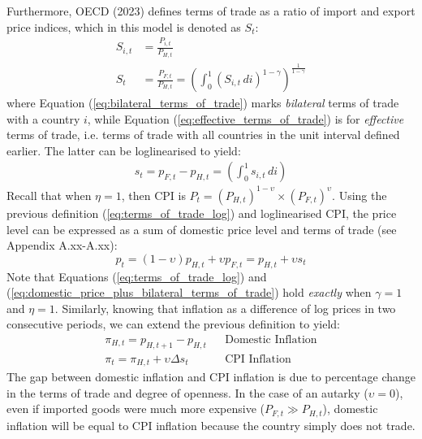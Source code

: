 Furthermore, OECD (2023) defines terms of trade as a ratio of import and export price indices, which in this model is denoted as $S_t$:
\begin{align}
    S_{i,t} &= \frac{P_{i,t}}{P_{H,t}}                       \label{eq:bilateral_terms_of_trade}                                                                                    \\
    S_{t} &=  \frac{P_{F,t}}{P_{H,t}} = \left(\int_{0}^{1} (S_{i,t} \, di)^{1-\gamma}\right)^{\frac{1}{1-\gamma}}            \label{eq:effective_terms_of_trade}              
\end{align}
where Equation (\ref{eq:bilateral_terms_of_trade}) marks \textit{bilateral} terms of trade with a country $i$, while Equation (\ref{eq:effective_terms_of_trade}) is for \textit{effective} terms of trade, i.e. terms of trade with all countries in the unit interval defined earlier. The latter can be loglinearised to yield:
\begin{align}
    s_t = p_{F,t} - p_{H,t} = \left(\int_{0}^{1} s_{i,t} \, di \right)                                      \label{eq:terms_of_trade_log} 
\end{align}
Recall that when $\eta = 1$, then CPI is $P_t = (P_{H,t})^{1-\upsilon} \times (P_{F,t})^{\upsilon}$. Using the previous definition (\ref{eq:terms_of_trade_log}) and loglinearised CPI, the price level can be expressed as a sum of domestic price level and terms of trade (see Appendix A.xx-A.xx):
\begin{equation}
    p_t = (1-\upsilon)p_{H,t} + \upsilon p_{F,t} = p_{H,t} + \upsilon s_t \label{eq:domestic_price_plus_bilateral_terms_of_trade}
\end{equation}
Note that Equations (\ref{eq:terms_of_trade_log}) and (\ref{eq:domestic_price_plus_bilateral_terms_of_trade}) hold \textit{exactly} when $\gamma=1$ and $\eta = 1$. Similarly, knowing that inflation as a difference of log prices in two consecutive periods, we can extend the previous definition to yield:
\begin{align}
    \pi_{H,t} = p_{H,t+1} - p_{H,t}         &  & \text{Domestic Inflation} \\
    \pi_{t} = \pi_{H,t} + \upsilon \Delta s_t &  & \text{CPI Inflation}
\end{align}
The gap between domestic inflation and CPI inflation is due to percentage change in the terms of trade and degree of openness. In the case of an autarky ($\upsilon = 0$), even if imported goods were much more expensive ($P_{F,t} \gg P_{H,t}$), domestic inflation will be equal to CPI inflation because the country simply does not trade.

